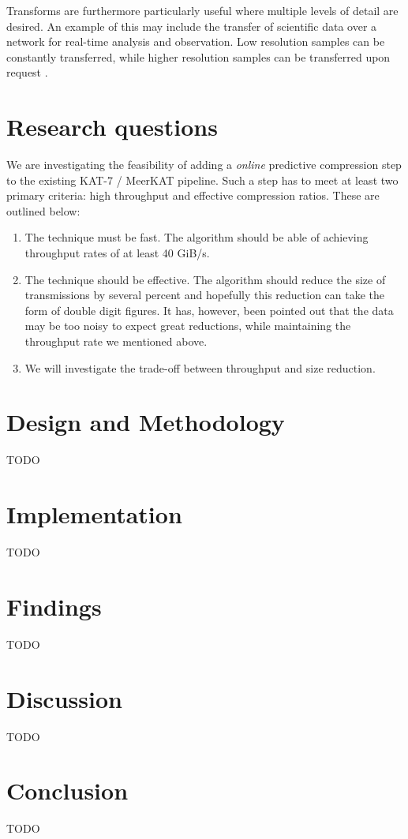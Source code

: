 \documentclass{acm_proc_article-sp}
\begin{document}
Transforms are furthermore particularly useful where multiple levels of detail are desired. An example of this may include the transfer of scientific data over a network 
for real-time analysis and observation. Low resolution samples can be constantly transferred, while higher resolution samples can be transferred upon request \cite{Tao:1994:PTS:951087.951108}.
\section{Research questions}
We are investigating the feasibility of adding a \textit{online} predictive compression step to the existing KAT-7 / MeerKAT pipeline. Such a step has to meet at least two primary
criteria: high throughput and effective compression ratios. These are outlined below:
\begin{enumerate}
 \item The technique must be fast. The algorithm should be able of achieving throughput rates of at least 40 GiB/s.
 \item The technique should be effective. The algorithm should reduce the size of transmissions by several percent and hopefully
       this reduction can take the form of double digit figures. It has, however, been pointed out that the data may
       be too noisy to expect great reductions, while maintaining the throughput rate we mentioned above.
 \item We will investigate the trade-off between throughput and size reduction.
\end{enumerate}
\section{Design and Methodology}
{\color{red}TODO}
\section{Implementation}
{\color{red}TODO}
\section{Findings}
{\color{red}TODO}
\section{Discussion}
{\color{red}TODO}
\section{Conclusion}
{\color{red}TODO}
\end{document}
